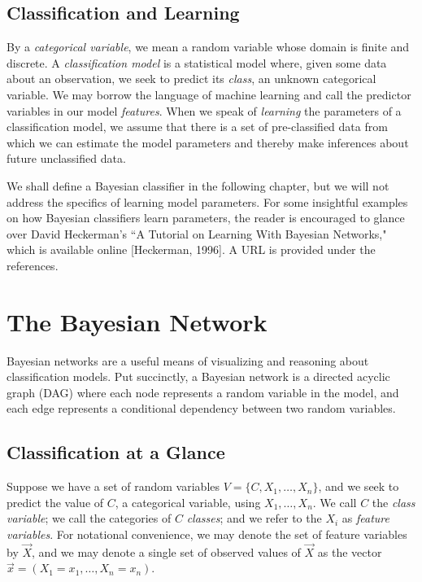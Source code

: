 \documentclass[12pt,twoside]{reedthesis}
\begin{document}
\section{Classification and Learning}
By a {\em categorical variable}, we mean a random variable whose domain is finite and discrete.
A {\em classification model} is a statistical model where, given some data about an observation, we seek to predict its {\em class}, an unknown categorical variable. We may borrow the language of machine learning and call the predictor variables in our model {\em features}. When we speak of {\em learning} the parameters of a classification model, we assume that there is a set of pre-classified data from which we can estimate the model parameters and thereby make inferences about future unclassified data. 

We shall define a Bayesian classifier in the following chapter, but we will not address the specifics of learning model parameters. For some insightful examples on how Bayesian classifiers learn parameters, the reader is encouraged to glance over David Heckerman's ``A Tutorial on Learning With Bayesian Networks," which is available online [Heckerman, 1996]. A URL is provided under the references. 

    \chapter{The Bayesian Network}

    	Bayesian networks are a useful means of visualizing and reasoning about classification models. Put succinctly, a Bayesian network is a directed acyclic graph (DAG) where each node represents a random variable in the model, and each edge represents a conditional dependency between two random variables.

	\section{Classification at a Glance}

	Suppose we have a set of random variables $V = \{C, X_1, \ldots, X_n\}$, and we seek to predict the value of $C$, a categorical variable, using $X_1, \ldots, X_n$. We call $C$ the {\em class variable}; we call the categories of $C$ {\em classes}; and we refer to the $X_i$ as {\em feature variables}. For notational convenience, we may denote the set of feature variables by $\vec{X}$, and we may denote a single set of observed values of $\vec{X}$ as the vector $\vec{x} = (X_1 = x_1, \ldots, X_n = x_n)$.
\end{document}
